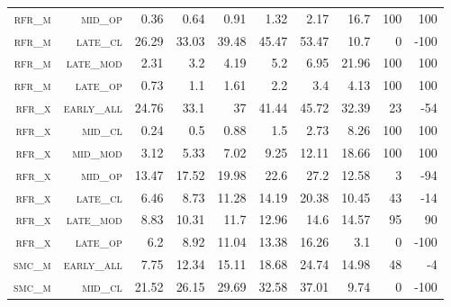 \begin{landscape}
\begin{table}[!htbp]
\begin{tabular}{@{}rrrrrrr|rrr@{}}
 \textsc{rfr\_m}      &  \textsc{mid\_op   }        &   0.36        &  0.64    &  0.91      &  1.32             &  2.17      &  16.7     &  100   &  100      \\
 \textsc{rfr\_m}      &  \textsc{late\_cl  }         &  26.29       &  33.03   &  39.48     &  45.47            &  53.47     &  10.7     &  0     &  -100      \\
 \textsc{rfr\_m}      &  \textsc{late\_mod }        &   2.31        &  3.2     &  4.19      &  5.2              &  6.95      &  21.96    &  100   &  100      \\
 \textsc{rfr\_m}      &  \textsc{late\_op  }        &   0.73        &  1.1     &  1.61      &  2.2              &  3.4       &  4.13     &  100   &  100     \\
 \textsc{rfr\_x}      &  \textsc{early\_all}         &  24.76       &  33.1    &  37        &  41.44            &  45.72     &  32.39    &  23    &  -54      \\
 \textsc{rfr\_x}      &  \textsc{mid\_cl   }        &   0.24        &  0.5     &  0.88      &  1.5              &  2.73      &  8.26     &  100   &  100      \\
 \textsc{rfr\_x}      &  \textsc{mid\_mod  }        &   3.12        &  5.33    &  7.02      &  9.25             &  12.11     &  18.66    &  100   &  100      \\
 \textsc{rfr\_x}      &  \textsc{mid\_op   }        &   13.47       &  17.52   &  19.98     &  22.6             &  27.2      &  12.58    &  3     &  -94      \\
 \textsc{rfr\_x}      &  \textsc{late\_cl  }        &   6.46        &  8.73    &  11.28     &  14.19            &  20.38     &  10.45    &  43    &  -14      \\
 \textsc{rfr\_x}      &  \textsc{late\_mod }        &   8.83        &  10.31   &  11.7      &  12.96            &  14.6      &  14.57    &  95    &  90      \\
 \textsc{rfr\_x}      &  \textsc{late\_op  }        &   6.2         &  8.92    &  11.04     &  13.38            &  16.26     &  3.1      &  0     &  -100     \\
 \textsc{smc\_m}      &  \textsc{early\_all}        &   7.75        &  12.34   &  15.11     &  18.68            &  24.74     &  14.98    &  48    &  -4      \\
 \textsc{smc\_m}      &  \textsc{mid\_cl   }        &   21.52       &  26.15   &  29.69     &  32.58            &  37.01     &  9.74     &  0     &  -100     \\

\end{tabular}
\end{table}
\end{landscape}

